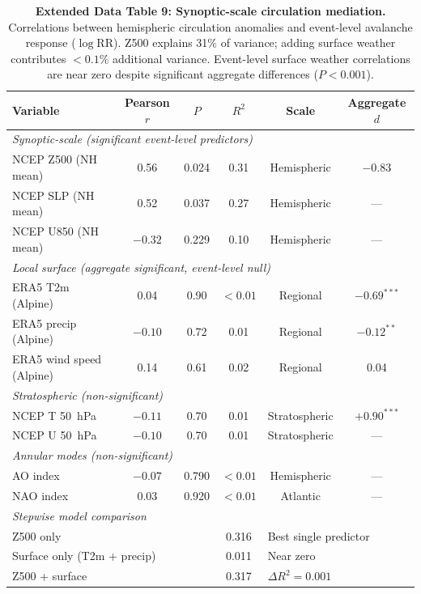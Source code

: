 \documentclass[11pt,letterpaper]{article}
\begin{document}
\begin{table}[!ht]
\centering
\caption{\textbf{Extended Data Table 9: Synoptic-scale circulation mediation.}
Correlations between hemispheric circulation anomalies and event-level avalanche response ($\log\mathrm{RR}$). Z500 explains 31\% of variance; adding surface weather contributes $< 0.1\%$ additional variance. Event-level surface weather correlations are near zero despite significant aggregate differences ($P < 0.001$).}
\label{tab:synoptic}
\small
\begin{tabular}{lccccc}
\toprule
Variable & Pearson $r$ & $P$ & $R^2$ & Scale & Aggregate $d$ \\
\midrule
\multicolumn{6}{l}{\textit{Synoptic-scale (significant event-level predictors)}} \\
NCEP Z500 (NH mean) & 0.56 & 0.024 & 0.31 & Hemispheric & $-0.83$ \\
NCEP SLP (NH mean) & 0.52 & 0.037 & 0.27 & Hemispheric & --- \\
NCEP U850 (NH mean) & $-0.32$ & 0.229 & 0.10 & Hemispheric & --- \\
\midrule
\multicolumn{6}{l}{\textit{Local surface (aggregate significant, event-level null)}} \\
ERA5 T2m (Alpine) & 0.04 & 0.90 & $< 0.01$ & Regional & $-0.69^{***}$ \\
ERA5 precip (Alpine) & $-0.10$ & 0.72 & 0.01 & Regional & $-0.12^{**}$ \\
ERA5 wind speed (Alpine) & 0.14 & 0.61 & 0.02 & Regional & 0.04 \\
\midrule
\multicolumn{6}{l}{\textit{Stratospheric (non-significant)}} \\
NCEP T 50~hPa & $-0.11$ & 0.70 & 0.01 & Stratospheric & $+0.90^{***}$ \\
NCEP U 50~hPa & $-0.10$ & 0.70 & 0.01 & Stratospheric & --- \\
\midrule
\multicolumn{6}{l}{\textit{Annular modes (non-significant)}} \\
AO index & $-0.07$ & 0.790 & $< 0.01$ & Hemispheric & --- \\
NAO index & 0.03 & 0.920 & $< 0.01$ & Atlantic & --- \\
\midrule
\multicolumn{6}{l}{\textit{Stepwise model comparison}} \\
\multicolumn{3}{l}{Z500 only} & 0.316 & \multicolumn{2}{l}{Best single predictor} \\
\multicolumn{3}{l}{Surface only (T2m + precip)} & 0.011 & \multicolumn{2}{l}{Near zero} \\
\multicolumn{3}{l}{Z500 + surface} & 0.317 & \multicolumn{2}{l}{$\Delta R^2 = 0.001$} \\
\bottomrule
\end{tabular}
\end{table}
\end{document}
